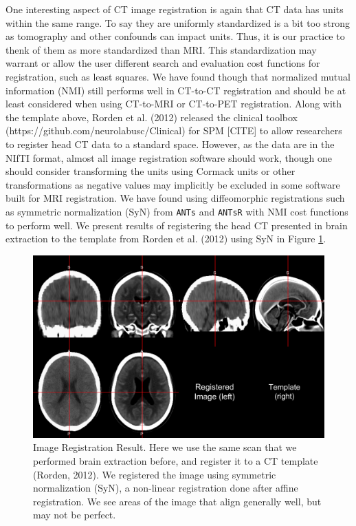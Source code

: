 \documentclass[]{elsarticle} %
\begin{document}
One interesting aspect of CT image registration is again that CT data has units within the same range. To say they are uniformly standardized is a bit too strong as tomography and other confounds can impact units. Thus, it is our practice to thenk of them as more standardized than MRI. This standardization may warrant or allow the user different search and evaluation cost functions for registration, such as least squares. We have found though that normalized mutual information (NMI) still performs well in CT-to-CT registration and should be at least considered when using CT-to-MRI or CT-to-PET registration. Along with the template above, Rorden et al. (2012) released the clinical toolbox (https://github.com/neurolabusc/Clinical) for SPM {[}CITE{]} to allow researchers to register head CT data to a standard space. However, as the data are in the NIfTI format, almost all image registration software should work, though one should consider transforming the units using Cormack units or other transformations as negative values may implicitly be excluded in some software built for MRI registration. We have found using diffeomorphic registrations such as symmetric normalization (SyN) from \texttt{ANTs} and \texttt{ANTsR} with NMI cost functions to perform well. We present results of registering the head CT presented in brain extraction to the template from Rorden et al. (2012) using SyN in Figure \ref{fig:reg}.

\begin{figure}
\includegraphics[width=1\linewidth]{reg_image} \caption{Image Registration Result.  Here we use the same scan that we performed brain extraction before, and register it to a CT template (Rorden, 2012).  We registered the image using symmetric normalization (SyN), a non-linear registration done after affine registration.  We see areas of the image that align generally well, but may not be perfect.}\label{fig:reg}
\end{figure}
\end{document}
